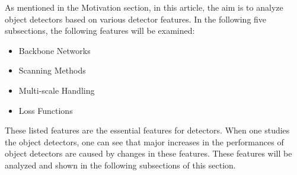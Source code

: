 \documentclass{article}
\begin{document}
\setlength{\parindent}{6ex}

\indent

As mentioned in the Motivation section, in this article, the aim is to analyze 
object detectors based on various detector features. In the following five 
subsections, the following features will be examined:
\begin{itemize}
    \item Backbone Networks
    \item Scanning Methods
    \item Multi-scale Handling
    \item Loss Functions
\end{itemize} 
\indent 

These listed features are the essential features for detectors. When one 
studies the object detectors, one can see that major increases in the 
performances of object detectors are caused by changes in these features. 
These features will be analyzed and shown in the following subsections of 
this section.
\end{document}
